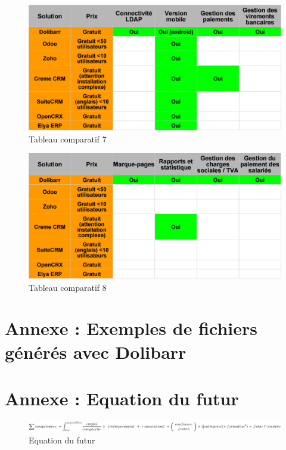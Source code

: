 \documentclass[report]{tnreport}
\begin{document}
\begin{figure}[h]
  \centering
  \includegraphics[width=13cm]{figures/compare7}
  \caption{Tableau comparatif 7}
  \label{fig:compare7}
\end{figure}
\begin{figure}[h]
  \centering
  \includegraphics[width=13cm]{figures/compare8}
  \caption{Tableau comparatif 8}
  \label{fig:compare8}
\end{figure}

\chapter{Annexe : Exemples de fichiers générés avec Dolibarr}




\chapter{Annexe : Equation du futur}
\begin{figure}[h]
  \centering
  \includegraphics[width=18cm]{figures/equation_du_futur}
  \caption{Equation du futur}
  \label{fig:futurEquation}
\end{figure}
\end{document}
